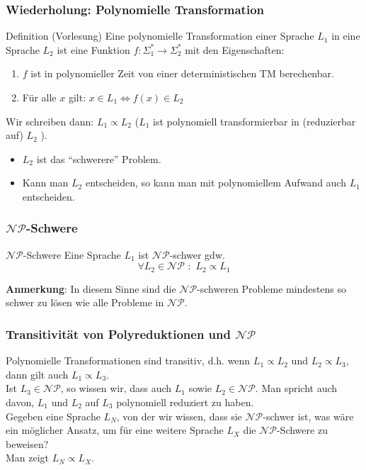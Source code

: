 \begin{frame}
\frametitle{Wiederholung: Polynomielle Transformation}
\begin{block}{Definition (Vorlesung)}
Eine polynomielle Transformation einer Sprache $L_1$ in eine Sprache $L_2$ ist eine Funktion
$f: \Sigma^*_1 \rightarrow \Sigma^*_2$ mit den Eigenschaften:
\begin{enumerate}
\item $f$ ist in polynomieller Zeit von einer deterministischen TM berechenbar.
\item Für alle $x$ gilt: $x \in L_1 \iff f(x) \in  L_2$
\end{enumerate}
Wir schreiben dann: $L_1 \propto L_2$ ($L_1$ ist polynomiell transformierbar in (reduzierbar auf) $L_2$ ).
\end{block}

\begin{itemize}
	\item $L_2$ ist das "`schwerere"' Problem.
	\item Kann man $L_2$ entscheiden, so kann man mit polynomiellem Aufwand auch $L_1$ entscheiden.
\end{itemize}
\end{frame}

\begin{frame}
\frametitle{$\mathcal{NP}$-Schwere}
\begin{block}{$\mathcal{NP}$-Schwere}
Eine Sprache $L_1$ ist $\mathcal{NP}$-schwer gdw. 
\[\forall L_2 \in \mathcal{NP} \,\, : \,\, L_2 \propto L_1\]
\end{block}
\textbf{Anmerkung}: In diesem Sinne sind die $\mathcal{NP}$-schweren Probleme mindestens so schwer zu lösen wie alle Probleme in $\mathcal{NP}$.
\end{frame}

\begin{frame}
\frametitle{Transitivität von Polyreduktionen und $\mathcal{NP}$}
Polynomielle Transformationen sind transitiv, d.h. wenn $L_1 \propto L_2$ und $L_2 \propto L_3$, dann gilt auch $L_1 \propto L_3$.\\[8pt]
Ist $L_3 \in \mathcal{NP}$, so wissen wir, dass auch $L_1$ sowie $L_2 \in \mathcal{NP}$. Man spricht auch davon, $L_1$ und $L_2$ auf $L_3$ polynomiell reduziert zu haben.\\[8pt]
Gegeben eine Sprache $L_N$, von der wir wissen, dass sie $\mathcal{NP}$-schwer ist, was wäre ein möglicher Ansatz, um für eine weitere Sprache $L_X$ die $\mathcal{NP}$-Schwere zu beweisen?\\[8pt]
\invincible\pause
\ducttape{1.5cm}
Man zeigt $L_N \propto L_X$.
\vincible
\end{frame}

